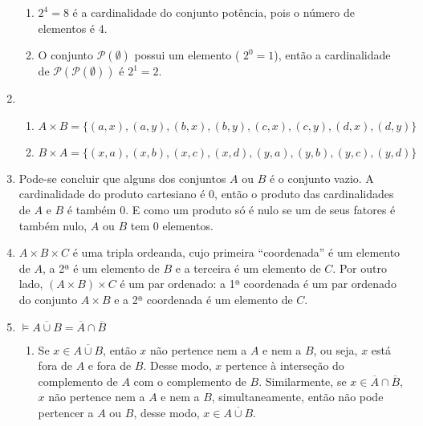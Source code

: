\documentclass{article}
\begin{document}
\begin{enumerate}
\begin{enumerate}
            \item \( 2^4 = 8 \) é a cardinalidade do conjunto potência, pois o número de elementos é 4.

            \item O conjunto \( \mathcal{P}(\emptyset) \) possui um elemento ( \(2^0 = 1 \)), então a cardinalidade de \( \mathcal{P}(\mathcal{P}(\emptyset)) \) é \( 2^1 = 2\).

        \end{enumerate}

    \item 

        \begin{enumerate}

            \item \( A \times B = \{ (a,x), (a,y), (b,x), (b,y), (c,x), (c,y), (d,x), (d,y)\} \)

            \item \( B \times A = \{ (x,a), (x,b), (x,c), (x,d), (y,a), (y,b), (y,c), (y,d)\}\)

        \end{enumerate}

    \item Pode-se concluir que alguns dos conjuntos \( A \) ou \( B \) é o conjunto vazio. A cardinalidade do produto cartesiano é 0, então o produto das cardinalidades de \( A \) e \( B \) é também 0. E como um produto só é nulo se um de seus fatores é também nulo, \( A \) ou \( B \) tem 0 elementos.

    \item \( A \times B \times C \) é uma tripla ordeanda, cujo primeira ``coordenada'' é um elemento de \( A \), a 2ª é um elemento de \( B \) e a terceira é um elemento de \( C \). Por outro lado, \( (A \times B) \times C \) é um par ordenado: a 1ª coordenada é um par ordenado do conjunto \( A \times B \) e a 2ª coordenada é um elemento de \( C \).

    \item \( \models \overline{A \cup B} = \overline{A} \cap \overline{B} \)

        \begin{enumerate}

            \item Se \( x \in \overline{A \cup B} \), então \( x \) não pertence nem a \( A \) e nem a \( B \), ou seja, \( x \) está fora de \( A \) e fora de \( B \). Desse modo, \( x \) pertence à interseção do complemento de \( A \) com o complemento de \( B \). Similarmente, se \( x \in \overline{A} \cap \overline{B} \), \( x \) não pertence nem a \( A \) e nem a \( B \), simultaneamente, então não pode pertencer a \( A \) ou \( B \), desse modo, \( x \in \overline{A \cup B} \).


\end{enumerate}
\end{enumerate}
\end{document}

